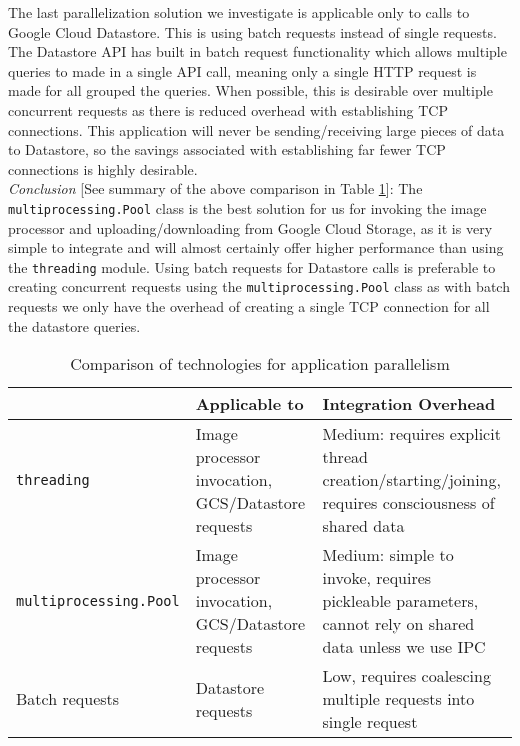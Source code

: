 \documentclass[10pt, onecolumn, draftclsnofoot, letterpaper, compsoc]{IEEEtran}
\begin{document}
The last parallelization solution we investigate is applicable only to calls to
Google Cloud Datastore. This is using batch requests instead of single requests.
The Datastore API has built in batch request functionality which allows multiple
queries to made in a single API call, meaning only a single HTTP request is made
for all grouped the queries\cite{batches}. When possible, this is desirable over
multiple concurrent requests as there is reduced overhead with establishing
TCP connections. This application will never be sending/receiving large
pieces of data to Datastore, so the savings associated with establishing
far fewer TCP connections is highly desirable. \\

\textit{Conclusion} [See summary of the above comparison in Table \ref{table:bret3}]:
The {\tt multiprocessing.Pool} class is the best solution for us
for invoking the image processor and uploading/downloading from Google Cloud
Storage, as it is very simple to integrate and will almost certainly offer
higher performance than using the {\tt threading} module. Using batch requests for
Datastore calls is preferable to creating concurrent requests using the
{\tt multiprocessing.Pool} class as with batch requests we only have the overhead
of creating a single TCP connection for all the datastore queries. \\

\begin{table}[h]
\centering
\caption{Comparison of technologies for application parallelism}
\begin{tabular}{|p{4.2cm}|p{4.2cm}|p{4.2cm}|}
\cline{3-3}
\hline

 & Applicable to & Integration Overhead \\ \hline

{\tt threading} & Image processor invocation, GCS/Datastore requests
& Medium: requires explicit thread creation/starting/joining,
requires consciousness of shared data \\ \hline

{\tt multiprocessing.Pool} & Image processor invocation, GCS/Datastore requests
& Medium: simple to invoke, requires pickleable parameters, cannot rely
on shared data unless we use IPC \\ \hline

Batch requests & Datastore requests & Low, requires coalescing multiple
requests into single request  \\ \hline

\end{tabular}
\label{table:bret3}
\end{table}
\end{document}
